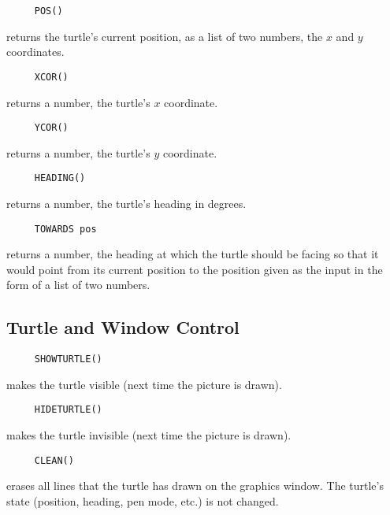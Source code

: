 \begin{verbatim}
     POS()
\end{verbatim}
returns the turtle's current position, as a list of two numbers, the
$x$ and $y$ coordinates.

\begin{verbatim}
     XCOR()
\end{verbatim}
returns a number, the turtle's $x$ coordinate.

\begin{verbatim}
     YCOR()
\end{verbatim}
returns a number, the turtle's $y$ coordinate.

\begin{verbatim}
     HEADING()
\end{verbatim}
returns a number, the turtle's heading in degrees.

\begin{verbatim}
     TOWARDS pos
\end{verbatim}
returns a number, the heading at which the turtle should be facing so
that it would point from its current position to the position given as
the input in the form of a list of two numbers.




\subsection{Turtle and Window Control}
\label{logoturtle:TWC}

\begin{verbatim}
     SHOWTURTLE()
\end{verbatim}
\label{logoturtle:showturtle}
makes the turtle visible (next time the picture is drawn).

\begin{verbatim}
     HIDETURTLE()
\end{verbatim}
\label{logoturtle:hideturtle}
makes the turtle invisible (next time the picture is drawn).

\begin{verbatim}
     CLEAN()
\end{verbatim}
erases all lines that the turtle has drawn on the graphics window.
The turtle's state (position, heading, pen mode, etc.) is not changed.

